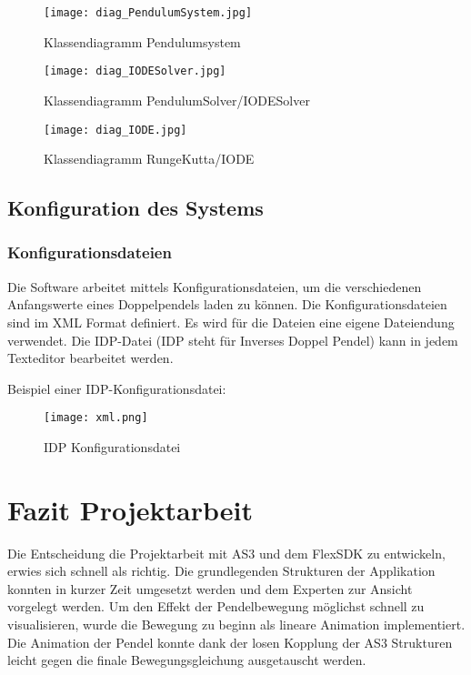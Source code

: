 \documentclass[12pt]{article}
\numberwithin{equation}{subsection}
\begin{document}
\begin{figure}[H]
	\centering
	\texttt{[image: diag\_PendulumSystem.jpg]}
	\caption{Klassendiagramm Pendulumsystem}
	\label{fig:xml}
\end{figure}

\begin{figure}[H]
	\centering
	\texttt{[image: diag\_IODESolver.jpg]}
	\caption{Klassendiagramm PendulumSolver/IODESolver}
	\label{fig:xml}

\end{figure}
\begin{figure}[H]
	\centering
	\texttt{[image: diag\_IODE.jpg]}
	\caption{Klassendiagramm RungeKutta/IODE}
	\label{fig:xml}
\end{figure}

\subsection{Konfiguration des Systems}
\subsubsection{Konfigurationsdateien}
Die Software arbeitet mittels Konfigurationsdateien, um die verschiedenen Anfangswerte eines Doppelpendels laden zu können. Die Konfigurationsdateien sind im XML Format definiert. Es wird für die Dateien eine eigene Dateiendung verwendet. Die IDP-Datei (IDP steht für Inverses Doppel Pendel) kann in jedem Texteditor bearbeitet werden.

Beispiel einer IDP-Konfigurationsdatei:
\begin{figure}[H]
	\centering
	\texttt{[image: xml.png]}
	\caption{IDP Konfigurationsdatei}
	\label{fig:xml}
\end{figure}

\newpage
\section{Fazit Projektarbeit}
Die Entscheidung die Projektarbeit mit AS3 und dem FlexSDK zu entwickeln, erwies sich schnell als richtig. Die grundlegenden Strukturen der Applikation konnten in kurzer Zeit umgesetzt werden und dem Experten zur Ansicht vorgelegt werden. Um den Effekt der Pendelbewegung  möglichst schnell zu visualisieren, wurde die Bewegung zu beginn als lineare Animation implementiert. Die Animation der Pendel konnte dank der losen Kopplung der AS3 Strukturen leicht gegen die finale Bewegungsgleichung ausgetauscht werden.
\end{document}
